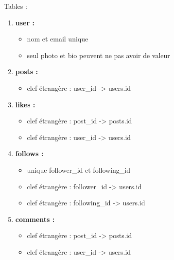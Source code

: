 \documentclass[12pt,a4paper]{article}
\begin{document}
Tables :
\begin{enumerate}
     


\item \textbf{user :}
  
  \begin{itemize}
    
  \item nom et email unique
  \item seul photo et bio peuvent ne pas avoir de valeur
  
  \end{itemize}

\item \textbf{posts :}
  
  \begin{itemize}
    
  \item clef étrangère : user\_id -> users.id
  
  \end{itemize}

\item \textbf{likes :}
  
  \begin{itemize}
    
  \item clef étrangère : post\_id -> posts.id
  \item clef étrangère : user\_id -> users.id
  
  \end{itemize}

\item \textbf{follows :}
  
  \begin{itemize}

  \item unique follower\_id et following\_id
  \item clef étrangère : follower\_id -> users.id
  \item clef étrangère : following\_id -> users.id
  
  \end{itemize}

\item \textbf{comments :}
  
  \begin{itemize}
    
  \item clef étrangère : post\_id -> posts.id
  \item clef étrangère : user\_id -> users.id
  
  \end{itemize}
    
\end{enumerate}
\end{document}
